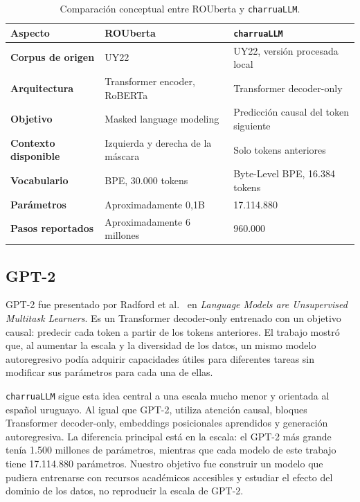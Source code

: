 \documentclass[11pt,a4paper]{article}
\newcommand{\charrua}{\texttt{charruaLLM}}
\begin{document}
\begin{table}[H]
    \centering
    \small
    \caption{Comparación conceptual entre ROUberta y \charrua.}
    \label{tab:rouberta-charrua}
    \begin{tabularx}{\textwidth}{>{\bfseries}l X X}
        \toprule
        Aspecto & ROUberta & \charrua \\
        \midrule
        Corpus de origen & UY22 & UY22, versión procesada local \\
        Arquitectura & Transformer encoder, RoBERTa & Transformer decoder-only \\
        Objetivo & Masked language modeling & Predicción causal del token siguiente \\
        Contexto disponible & Izquierda y derecha de la máscara & Solo tokens anteriores \\
        Vocabulario & BPE, 30.000 tokens & Byte-Level BPE, 16.384 tokens \\
        Parámetros & Aproximadamente 0,1B & 17.114.880 \\
        Pasos reportados & Aproximadamente 6 millones & 960.000 \\
        \bottomrule
    \end{tabularx}
\end{table}


\subsection{GPT-2}

GPT-2 fue presentado por Radford et al.~\cite{radford2019} en \emph{Language
Models are Unsupervised Multitask Learners}. Es un Transformer decoder-only
entrenado con un objetivo causal: predecir cada token a partir de los tokens
anteriores. El trabajo mostró que, al aumentar la escala y la diversidad de los
datos, un mismo modelo autoregresivo podía adquirir capacidades útiles para
diferentes tareas sin modificar sus parámetros para cada una de ellas.

\charrua{} sigue esta idea central a una escala mucho menor y orientada al
español uruguayo. Al igual que GPT-2, utiliza atención causal, bloques
Transformer decoder-only, embeddings posicionales aprendidos y generación
autoregresiva. La diferencia principal está en la escala: el GPT-2 más grande
tenía 1.500 millones de parámetros, mientras que cada modelo de este trabajo
tiene 17.114.880 parámetros. Nuestro objetivo fue construir un modelo que
pudiera entrenarse con recursos académicos accesibles y estudiar el efecto del
dominio de los datos, no reproducir la escala de GPT-2.
\end{document}
